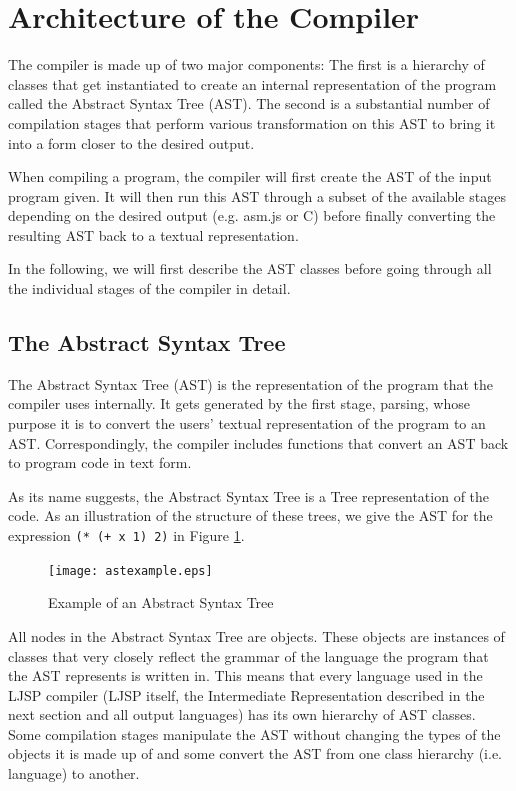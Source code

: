 \documentclass[11pt]{report}
\begin{document}
\section{Architecture of the Compiler}
The compiler is made up of two major components: The first is a hierarchy of classes that get instantiated to create an internal representation of the program called the Abstract Syntax Tree (AST). The second is a substantial number of compilation stages that perform various transformation on this AST to bring it into a form closer to the desired output.

When compiling a program, the compiler will first create the AST of the input program given. It will then run this AST through a subset of the available stages depending on the desired output (e.g. asm.js or C) before finally converting the resulting AST back to a textual representation.

In the following, we will first describe the AST classes before going through all the individual stages of the compiler in detail.

\subsection{The Abstract Syntax Tree}
The Abstract Syntax Tree (AST) is the representation of the program that the compiler uses internally. It gets generated by the first stage, parsing, whose purpose it is to convert the users' textual representation of the program to an AST. Correspondingly, the compiler includes functions that convert an AST back to program code in text form.

As its name suggests, the Abstract Syntax Tree is a Tree representation of the code. As an illustration of the structure of these trees, we give the AST for the expression \hbox{\texttt{(* (+ x 1) 2)}} in Figure \ref{astexample}.

\begin{figure}[ht]
\begin{center}
\texttt{[image: astexample.eps]}
\end{center}
\caption{Example of an Abstract Syntax Tree}
\label{astexample}
\end{figure}

All nodes in the Abstract Syntax Tree are objects. These objects are instances of classes that very closely reflect the grammar of the language the program that the AST represents is written in. This means that every language used in the LJSP compiler (LJSP itself, the Intermediate Representation described in the next section and all output languages) has its own hierarchy of AST classes. Some compilation stages manipulate the AST without changing the types of the objects it is made up of and some convert the AST from one class hierarchy (i.e. language) to another. 
\end{document}
